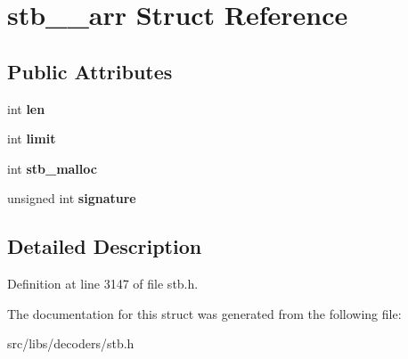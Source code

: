 \hypertarget{structstb____arr}{\section{stb\-\_\-\-\_\-arr Struct Reference}
\label{structstb____arr}
}
\subsection*{Public Attributes}
\begin{DoxyCompactItemize}
\item 
\hypertarget{structstb____arr_acd941aed9dd5c1b35f808015f0fdabd6}{int {\bfseries len}}\label{structstb____arr_acd941aed9dd5c1b35f808015f0fdabd6}

\item 
\hypertarget{structstb____arr_a9c55b19519ed39eb476ddf62e0f9cd4c}{int {\bfseries limit}}\label{structstb____arr_a9c55b19519ed39eb476ddf62e0f9cd4c}

\item 
\hypertarget{structstb____arr_a5fb8ca979b5f99143d8f12d8e5475b5a}{int {\bfseries stb\-\_\-malloc}}\label{structstb____arr_a5fb8ca979b5f99143d8f12d8e5475b5a}

\item 
\hypertarget{structstb____arr_a65124f8b11e048ba49709edd3749bd45}{unsigned int {\bfseries signature}}\label{structstb____arr_a65124f8b11e048ba49709edd3749bd45}

\end{DoxyCompactItemize}


\subsection{Detailed Description}


Definition at line 3147 of file stb.\-h.



The documentation for this struct was generated from the following file\-:\begin{DoxyCompactItemize}
\item 
src/libs/decoders/stb.\-h\end{DoxyCompactItemize}
